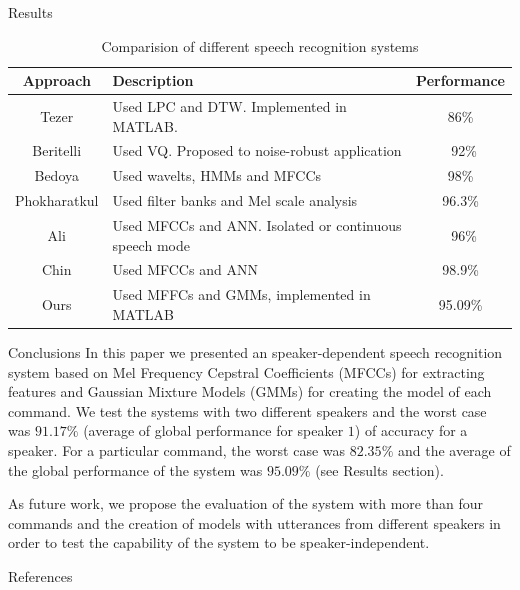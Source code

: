 \documentclass[final]{beamer}
\begin{document}
\begin{frame}{}
\begin{textblock}{39.5}
\begin{block}{Results}
\begin{table}[!ht]
	\small
	\begin{center}	
	\begin{tabular}{|c | p{17.5cm} | c|}
	\hline
	\textbf{Approach} & \textbf{Description} & \textbf{Performance} \\
	\hline
	\hline
	Tezer \cite{Tezer} &
		Used LPC and DTW. Implemented in MATLAB. &
		86\% \\
	Beritelli \cite{Beritelli} &
		Used VQ. Proposed to noise-robust application &
		~92\% \\
	Bedoya \cite{Bedoya} &
		Used wavelts, HMMs and MFCCs &
		98\% \\
	Phokharatkul \cite{Phokharatkul} &
		Used filter banks and Mel scale analysis &
		96.3\% \\
	Ali \cite{Ali} &
		Used MFCCs and ANN. Isolated or continuous speech mode &
		~96\% \\
	Chin \cite{Chin} &
		Used MFCCs and ANN&
		98.9\% \\
	Ours &
		Used MFFCs and GMMs, implemented in MATLAB &
		95.09\%\\
	\hline
	\end{tabular}
	\end{center}	
	\caption{Comparision of different speech recognition systems}
	\label{table_comp}
\end{table}

\end{block}

\begin{block}{Conclusions}
In this paper we presented an speaker-dependent speech recognition system based on Mel Frequency Cepstral Coefficients (MFCCs) for extracting features and Gaussian Mixture Models (GMMs) for creating the model of each command. We test the systems with two different speakers and the worst case was $91.17\%$ (average of global performance for speaker $1$) of accuracy for a speaker. For a particular command, the worst case was $82.35\%$ and the average of the global performance of the system was $95.09\%$ (see Results section).

As future work, we propose the evaluation of the system with more than four commands and the creation of models with utterances from different speakers in order to test the capability of the system to be speaker-independent.
\end{block}

\begin{block}{References}
\small

\end{block}

\end{textblock}

\end{frame}
\end{document}
